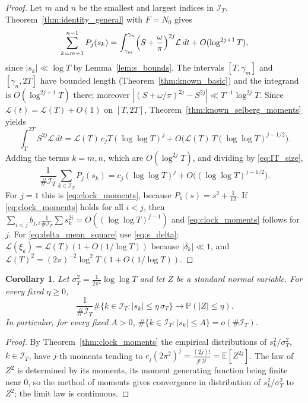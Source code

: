 \documentclass[11pt,reqno]{amsart}
\theoremstyle{plain}\newtheorem{theorem}{Theorem}[section]\newtheorem{proposition}[theorem]{Proposition}\newtheorem{lemma}[theorem]{Lemma}\newtheorem{corollary}[theorem]{Corollary}
\theoremstyle{definition}\newtheorem{hypothesis}[theorem]{Hypothesis}\newtheorem{definition}[theorem]{Definition}
\theoremstyle{remark}\newtheorem{remark}[theorem]{Remark}\newtheorem{experiment}[theorem]{Experiment}\newtheorem{question}[theorem]{Question}\newtheorem{heuristic}[theorem]{Heuristic}\newtheorem{conjecture}[theorem]{Conjecture}
\newcommand{\NO}{N_0}\newcommand{\lL}{\mathcal L}\newcommand{\IT}{\mathcal I_T}\newcommand{\R}{\mathbb R}\newcommand{\N}{\mathbb N}\newcommand{\eps}{\varepsilon}\newcommand{\sgn}{\operatorname{sgn}}
\begin{document}
\begin{proof}
Let $m$ and $n$ be the smallest and largest indices in $\IT$. Theorem~\ref{thm:identity_general} with $F=\NO$ gives
\begin{equation}
\sum_{k=m+1}^{n-1}P_j(s_k)=\int_{\gamma_m}^{\gamma_n}\Bigl(S+\frac\omega\pi\Bigr)^{2j}\lL\,dt+O(\log^{2j+1}T),
\label{eq:moments_step1}
\end{equation}
since $|s_k|\ll\log T$ by Lemma~\ref{lem:s_bounds}. The intervals $[T,\gamma_m]$ and $[\gamma_n,2T]$ have bounded length (Theorem~\ref{thm:known_basic}) and the integrand is $O(\log^{2j+1}T)$ there; moreover $|(S+\omega/\pi)^{2j}-S^{2j}|\ll T^{-1}\log^{2j}T$. Since $\lL(t)=\lL(T)+O(1)$ on $[T,2T]$, Theorem~\ref{thm:known_selberg_moments} yields
\begin{equation}
\int_T^{2T}S^{2j}\lL\,dt=\lL(T)\,c_jT(\log\log T)^j+O\bigl(\lL(T)\,T(\log\log T)^{j-1/2}\bigr).
\label{eq:moments_step2}
\end{equation}
Adding the terms $k=m,n$, which are $O(\log^{2j}T)$, and dividing by \eqref{eq:IT_size},
\begin{equation}
\frac1{\#\IT}\sum_{k\in\IT}P_j(s_k)=c_j(\log\log T)^j+O\bigl((\log\log T)^{j-1/2}\bigr).
\label{eq:moments_step3}
\end{equation}
For $j=1$ this is \eqref{eq:clock_moments}, because $P_1(s)=s^2+\frac1{12}$. If \eqref{eq:clock_moments} holds for all $i<j$, then $\sum_{i<j}b_{j,i}\frac1{\#\IT}\sum s_k^{2i}=O((\log\log T)^{j-1})$ and \eqref{eq:clock_moments} follows for $j$. For \eqref{eq:delta_mean_square} use \eqref{eq:s_delta}: $\lL(\xi_k)=\lL(T)(1+O(1/\log T))$ because $|\delta_k|\ll1$, and $\lL(T)^2=(2\pi)^{-2}\log^2T\,(1+O(1/\log T))$.
\end{proof}

\begin{corollary}\label{cor:clock_distribution}
Let $\sigma_T^2=\frac1{2\pi^2}\log\log T$ and let $Z$ be a standard normal variable. For every fixed $\eta\ge0$,
\begin{equation}
\frac1{\#\IT}\#\{k\in\IT:|s_k|\le\eta\,\sigma_T\}\longrightarrow\mathbb P(|Z|\le\eta).
\label{eq:clock_distribution}
\end{equation}
In particular, for every fixed $A>0$, $\#\{k\in\IT:|s_k|\le A\}=o(\#\IT)$.
\end{corollary}

\begin{proof}
By Theorem~\ref{thm:clock_moments} the empirical distributions of $s_k^2/\sigma_T^2$, $k\in\IT$, have $j$-th moments tending to $c_j(2\pi^2)^j=\frac{(2j)!}{j!\,2^j}=\mathbb E[Z^{2j}]$. The law of $Z^2$ is determined by its moments, its moment generating function being finite near $0$, so the method of moments \cite[\S30]{Billingsley1995} gives convergence in distribution of $s_k^2/\sigma_T^2$ to $Z^2$; the limit law is continuous.
\end{proof}
\end{document}
